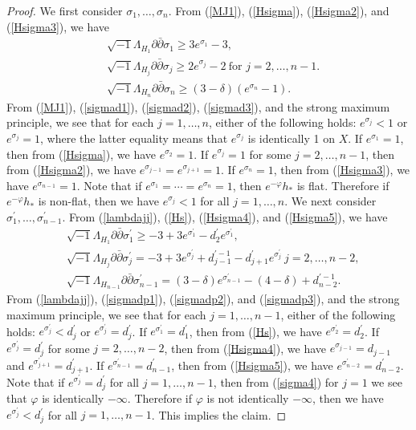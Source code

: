 \documentclass[12pt]{article}
\theoremstyle{definition}
\def\refe{\ast}
\def\inum{{\sqrt{-1}}}
\begin{document}
\begin{proof} 
We first consider $\sigma_1,\dots, \sigma_n$. From (\ref{MJ1}), (\ref{Hsigma}), (\ref{Hsigma2}), and (\ref{Hsigma3}), we have
\begin{align}
&\inum\Lambda_{H_1}\partial \bar{\partial} \sigma_1\geq 3e^{\sigma_1}-3, \label{sigmad1}\\
&\inum \Lambda_{H_j}\partial\bar{\partial}\sigma_j \geq 2e^{\sigma_j}-2 \ \text{for $j=2,\dots, n-1$}. \label{sigmad2} \\
&\inum \Lambda_{H_n}\partial\bar{\partial} \sigma_n\geq (3-\delta)(e^{\sigma_n}-1). \label{sigmad3}
\end{align}
From (\ref{MJ1}), (\ref{sigmad1}), (\ref{sigmad2}), (\ref{sigmad3}), and the strong maximum principle, we see that for each $j=1,\dots, n$, either of the following holds: $e^{\sigma_j}<1$ or $e^{\sigma_j}=1$, where the latter equality means that $e^{\sigma_j}$ is identically 1 on $X$. If $e^{\sigma_1}=1$, then from (\ref{Hsigma}), we have $e^{\sigma_2}=1$. If $e^{\sigma_j}=1$ for some $j=2,\dots, n-1$, then from (\ref{Hsigma2}), we have $e^{\sigma_{j-1}}=e^{\sigma_{j+1}}=1$. If $e^{\sigma_n}=1$, then from (\ref{Hsigma3}), we have $e^{\sigma_{n-1}}=1$. Note that if $e^{\sigma_1}=\cdots =e^{\sigma_n}=1$, then $e^{-\varphi}h_\refe$ is flat. Therefore if $e^{-\varphi}h_\refe$ is non-flat, then we have $e^{\sigma_j}<1$ for all $j=1,\dots, n$. We next consider $\sigma_1^\prime,\dots, \sigma_{n-1}^\prime$. From (\ref{lambdajj}), (\ref{Hs}), (\ref{Hsigma4}), and (\ref{Hsigma5}), we have
\begin{align}
&\inum \Lambda_{H_1}\partial \bar{\partial} \sigma^\prime_1\geq -3+3e^{\sigma_1^\prime}-d_2^\prime e^{\sigma_1^\prime}, \label{sigmadp1} \\
&\inum \Lambda_{H_j}\partial \bar{\partial} \sigma^\prime_j=-3+3e^{\sigma_j^\prime}+d_{j-1}^{\prime-1}-d_{j+1}^\prime e^{\sigma_j^\prime}\ \text{$j=2,\dots, n-2$}, \label{sigmadp2}\\
&\inum \Lambda_{H_{n-1}}\partial \bar{\partial} \sigma^\prime_{n-1}=(3-\delta)e^{\sigma_{n-1}^\prime}-(4-\delta)+d_{n-2}^{\prime-1}. \label{sigmadp3}
\end{align}
From (\ref{lambdajj}), (\ref{sigmadp1}), (\ref{sigmadp2}), and (\ref{sigmadp3}), and the strong maximum principle, we see that for each $j=1,\dots, n-1$, either of the following holds: $e^{\sigma_j^\prime}<d_j^\prime$ or $e^{\sigma_j^\prime}=d_j^\prime$. If $e^{\sigma_1^\prime}=d_1^\prime$, then from (\ref{Hs}), we have $e^{\sigma_2^\prime}=d_2^\prime$. If $e^{\sigma_j^\prime}=d_j^\prime$ for some $j=2,\dots, n-2$, then from (\ref{Hsigma4}), we have $e^{\sigma_{j-1}}=d_{j-1}$ and $e^{\sigma_{j+1}^\prime}=d_{j+1}^\prime$. If $e^{\sigma_{n-1}^\prime}=d_{n-1}^\prime$, then from (\ref{Hsigma5}), we have $e^{\sigma_{n-2}^\prime}=d_{n-2}^\prime$. Note that if $e^{\sigma_j^\prime}=d_j^\prime$ for all $j=1,\dots, n-1$, then from (\ref{sigma4}) for $j=1$ we see that $\varphi$ is identically $-\infty$. Therefore if $\varphi$ is not identically $-\infty$, then we have $e^{\sigma_j^\prime}<d_j^\prime$ for all $j=1,\dots, n-1$. This implies the claim. 
\end{proof}
\end{document}
